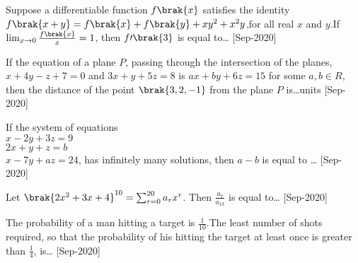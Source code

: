 \iffalse
\title{2020}
\author{EE24BTECH11021}
\section{integer}
\fi
 \item Suppose a differentiable function $f\brak{x}$ satisfies the identity $f\brak{x+y}=f\brak{x}+f\brak{y}+xy^2+x^2y$,for all real $x$ and $y$.If $\lim_{x \to 0}\frac{f\brak{x}}{x}=1$, then $f\prime \brak{3}$ is equal to\dots
    \hfill{[Sep-2020]}
    \item If the equation of a plane $P$, passing through the intersection of the planes, $x+4y-z+7=0$ and $3x+y+5z=8$ is $ax+by+6z=15$ for some $a, b\in R$, then the distance of the point $\brak{3,2,-1}$ from the plane $P$ is\dots units
    \hfill{[Sep-2020]}
    \item If the system of equations\\
    $x-2y+3z=9$\\
    $2x+y+z=b$\\
    $x-7y+az=24$, has infinitely many solutions, then $a-b$ is equal to \dots 
    \hfill{[Sep-2020]}
    \item Let $\brak{2x^2+3x+4}^{10}=\sum_{r=0}^{20}a_rx^r$. Then $\frac{a_7}{a_{13}}$ is equal to\dots
    \hfill{[Sep-2020]}
    \item The probability of a man hitting a target is $\frac{1}{10}$.The least number of shots required, so that the probability of his hitting the target at least once is greater than $\frac{1}{4}$, is\dots
    \hfill{[Sep-2020]}
